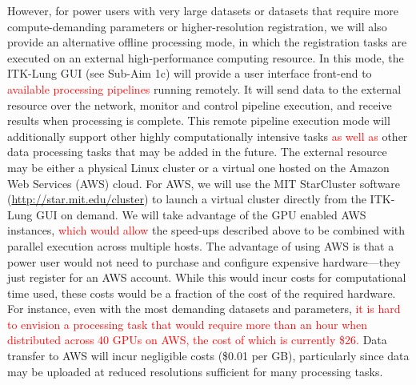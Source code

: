 \documentclass[11pt,]{article}
\begin{document}
However, for power users with very large datasets or datasets that
require more compute-demanding parameters or higher-resolution
registration, we will also provide an alternative offline processing
mode, in which the registration tasks are executed on an external
high-performance computing resource. In this mode, the ITK-Lung GUI (see
Sub-Aim 1c) will provide a user interface front-end to
\textcolor{red}{available processing pipelines} running remotely. It
will send data to the external resource over the network, monitor and
control pipeline execution, and receive results when processing is
complete. This remote pipeline execution mode will additionally support
other highly computationally intensive tasks \textcolor{red}{as well as}
other data processing tasks that may be added in the future. The
external resource may be either a physical Linux cluster or a virtual
one hosted on the Amazon Web Services (AWS) cloud. For AWS, we will use
the MIT StarCluster software (\url{http://star.mit.edu/cluster}) to
launch a virtual cluster directly from the ITK-Lung GUI on demand. We
will take advantage of the GPU enabled AWS instances,
\textcolor{red}{which would allow} the speed-ups described above to be
combined with parallel execution across multiple hosts. The advantage of
using AWS is that a power user would not need to purchase and configure
expensive hardware---they just register for an AWS account. While this
would incur costs for computational time used, these costs would be a
fraction of the cost of the required hardware. For instance, even with
the most demanding datasets and parameters,
\textcolor{red}{it is hard to envision a processing task that would require
more than an hour when distributed across 40 GPUs on AWS, the cost of which is currently \$26.}
Data transfer to AWS will incur negligible costs (\$0.01 per GB),
particularly since data may be uploaded at reduced resolutions
sufficient for many processing tasks.
\end{document}
